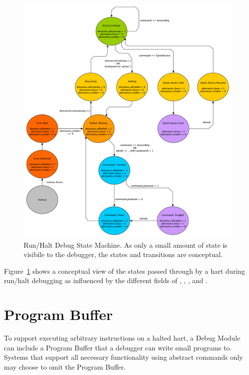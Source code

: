 

\begin{figure}
   \centering
   \includegraphics[width=\textwidth]{fig/abstract_commands.pdf}
   \caption[Run/Halt Debug State Machine]{Run/Halt Debug State Machine.
     As only a small amount of state is visibile to the debugger,
     the states and transitions are conceptual.}
   \label{fig:abstract_sm}
\end{figure}

Figure~\ref{fig:abstract_sm} shows a conceptual view of the states
passed through by a hart during run/halt debugging as influenced
by the different fields of \Rdmcontrol, \Rabstractcs, \Rabstractauto, and
\Rcommand.

\section{Program Buffer} \label{programbuffer}

To support executing arbitrary instructions on a halted hart,
a Debug Module can include a 
Program Buffer that a debugger can write small programs to. Systems
that support all necessary functionality using abstract commands
only may choose to omit the Program Buffer.


